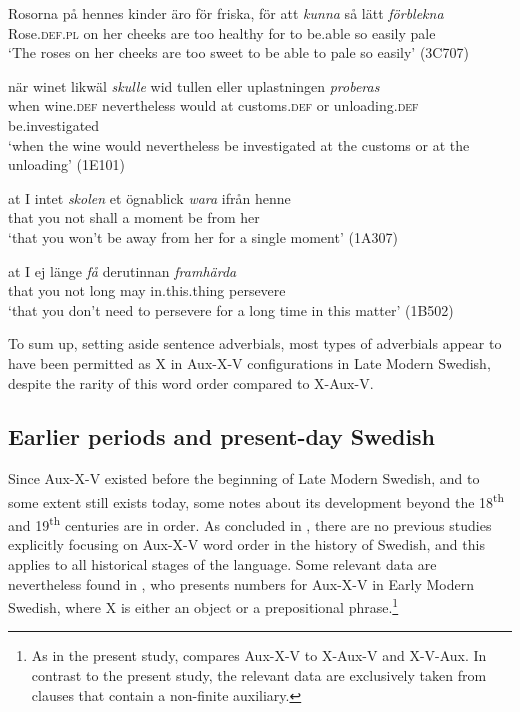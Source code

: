\documentclass[output=paper, colorlinks, citecolor=brown]{langscibook}
\begin{document}
\ea
\label{ex:sangfelt:26}
\ea \label{ex:sangfelt:26a}
\gll Rosorna på hennes kinder äro för friska, för att \textit{kunna} {så} {lätt} \textit{förblekna}\\ %
 Rose.\textsc{def.pl} on her cheeks are too healthy for to be.able so easily pale\\
\glt ‘The roses on her cheeks are too sweet to be able to pale so easily’ (3C707)

\ex\label{ex:sangfelt:26b}
\gll när winet likwäl \textit{skulle} {wid} {tullen} {eller} {uplastningen} \textit{proberas}\\
 when wine.\textsc{def} nevertheless would at customs.\textsc{def} or unloading.\textsc{def} be.investigated\\
\glt ‘when the wine would nevertheless be investigated at the customs or at the unloading’ (1E101)

\ex\label{ex:sangfelt:26c}
\gll at I intet \textit{skolen} {et} {ögnablick} \textit{wara} ifrån henne \\
 that you not shall a moment be from her\\
\glt ‘that you won’t be away from her for a single moment’ (1A307)

\ex\label{ex:sangfelt:26d}
\gll at I ej länge \textit{få} {derutinnan} \textit{framhärda} \\
 that you not long may in.this.thing persevere\\
\glt ‘that you don’t need to persevere for a long time in this matter’ (1B502)
\z
\z 


 To sum up, setting aside sentence adverbials, most types of adverbials appear to have been permitted as X in Aux-X-V configurations in Late Modern Swedish, despite the rarity of this word order compared to X-Aux-V.

\subsection{Earlier periods and present-day Swedish}\label{sec:sangfelt:4.3}\largerpage[2]

 Since Aux-X-V existed before the beginning of Late Modern Swedish, and to some extent still exists today, some notes about its development beyond the 18\textsuperscript{th} and 19\textsuperscript{th} centuries are in order. As concluded in , there are no previous studies explicitly focusing on Aux-X-V word order in the history of Swedish, and this applies to all historical stages of the language. Some relevant data are nevertheless found in \citet{Sangfelt2019}, who presents numbers for Aux-X-V in Early Modern Swedish, where X is either an object or a prepositional phrase.\footnote{As in the present study, \citet{Sangfelt2019} compares Aux-X-V to X-Aux-V and X-V-Aux. In contrast to the present study, the relevant data are exclusively taken from clauses that contain a non-finite auxiliary.}
\end{document}
